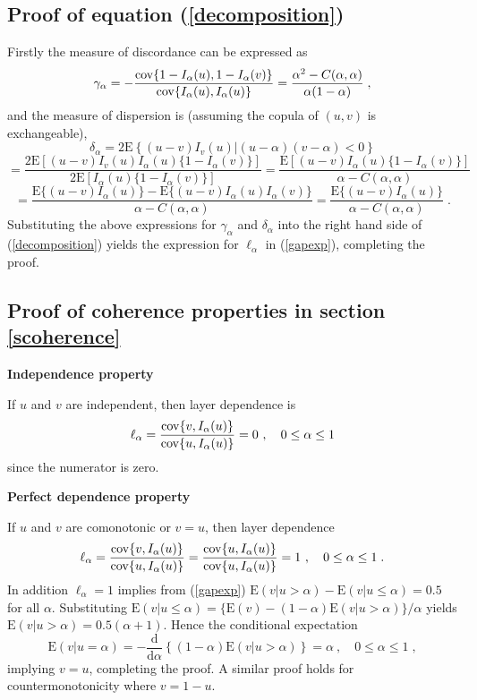 \documentclass[authoryear]{elsarticle}
\newcommand{\cov}{{\rm cov}}
\newcommand{\E}{{\mathrm E}}
\newcommand{\de}{\mathrm{d}}
\newcommand{\cq}{\ ,\quad }
\newcommand{\eref}[1]{(\ref{#1})}
\newcommand{\aref}[1]{\ref{#1}}
\begin{document}
\subsection{Proof of equation \eref{decomposition}}

Firstly the measure of discordance can be expressed as
$$
\gamma_\alpha
=-\frac{\cov\{1-I_\alpha(u),1-I_\alpha(v)\}}{\cov\{I_\alpha(u),I_\alpha(u)\}}
=\frac{\alpha^2-C(\alpha,\alpha)}{\alpha(1-\alpha)}   \;,
$$
and the measure of dispersion is (assuming the copula of $(u,v)$ is exchangeable),
$$
\delta_\alpha = 2 \E\left\{(u-v)I_v(u)|(u-\alpha)(v-\alpha)<0\right\}
$$
$$
=  \frac{2\E[(u-v)I_v(u)I_\alpha(u)\{1-I_\alpha(v)\}]}{2\E[I_\alpha(u)\{1-I_\alpha(v)\}]}
= \frac{\E[(u-v)I_\alpha(u)\{1-I_\alpha(v)\}]}{\alpha-C(\alpha,\alpha)}
$$
$$
= \frac{\E\{(u-v)I_\alpha(u)\}-\E\{(u-v)I_\alpha(u)I_\alpha(v)\}}{\alpha-C(\alpha,\alpha)}
 = \frac{\E\{(u-v)I_\alpha(u)\}}{\alpha-C(\alpha,\alpha)} \;.
$$
Substituting the above expressions for $\gamma_\alpha$ and $\delta_\alpha$ into the right hand side of \eref{decomposition} yields the expression for $\ell_\alpha$ in \eref{gapexp}, completing the proof.



\subsection{Proof of coherence properties in section \aref{scoherence}}

\textbf{Independence property}

If $u$ and $v$ are independent, then layer dependence is
$$
\ell_\alpha = \frac{\cov\{v,I_\alpha(u)\}}{\cov\{u,I_\alpha(u)\}}
=0 \cq  0\leq\alpha\leq 1
$$
since the numerator is zero.


\textbf{Perfect dependence property}

If $u$ and $v$ are comonotonic or $v=u$, then layer dependence
$$
\ell_\alpha = \frac{\cov\{v,I_\alpha(u)\}}{\cov\{u,I_\alpha(u)\}}= \frac{\cov\{u,I_\alpha(u)\}}{\cov\{u,I_\alpha(u)\}}
=1 \cq  0\leq\alpha\leq 1  \;.
$$
In addition $\ell_\alpha=1$ implies from \eref{gapexp} $\E(v|u>\alpha)-\E(v|u\le\alpha)=0.5$ for all $\alpha$. Substituting $\E(v|u\le\alpha)= \{\E(v)-(1-\alpha)\E(v|u>\alpha)\}/\alpha$ yields $\E(v|u>\alpha)=0.5(\alpha+1)$. Hence the conditional expectation
$$
\E(v|u=\alpha) = - \frac{\de}{\de\alpha} \left\{(1-\alpha)\E(v|u>\alpha) \right\} = \alpha \cq 0\le\alpha\le 1\; ,
$$
implying $v=u$, completing the proof. A similar proof holds for countermonotonicity where $v=1-u$.
\end{document}
